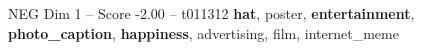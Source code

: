 \begin{textsample}{NEG Dim 1 – Score -2.00 – t011312}  \label{ex:f1_neg_019}
\textbf{hat}, poster, \textbf{entertainment}, \textbf{photo\_caption}, \textbf{happiness}, advertising, film, internet\_meme

\end{textsample}
